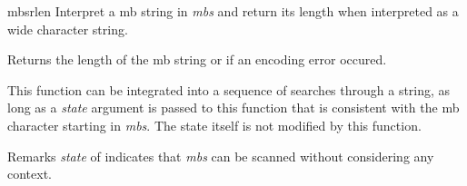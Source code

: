 \begin{DoxyDocu}{mbsrlen}
\label{mbstrings_8h_a39f6de516b0266a51f617056be64b5a2_a39f6de516b0266a51f617056be64b5a2}
Interpret a mb string in {\itshape mbs} and return its length when interpreted as a wide character string.

\begin{DoxyReturn}{Returns}
the length of the mb string or  if an encoding error occured.
\end{DoxyReturn}
This function can be integrated into a sequence of searches through a string, as long as a {\itshape state} argument is passed to this function that is consistent with the mb character starting in {\itshape mbs}. The state itself is not modified by this function.

\begin{DoxyRemark}{Remarks}
{\itshape state} of  indicates that {\itshape mbs} can be scanned without considering any context.
\end{DoxyRemark}
\end{DoxyDocu}

